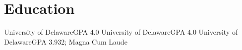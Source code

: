 \section{Education}
		{University of Delaware}{GPA 4.0}{}{}
		{University of Delaware}{GPA 4.0}{}{}
		{University of Delaware}{}{}{GPA 3.932; Magna Cum Laude}

